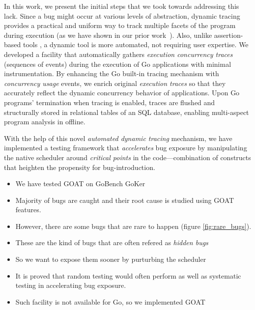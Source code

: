  In
this work, we present the initial steps that we took towards addressing this lack.
%
Since a bug might
occur
at various levels of abstraction, dynamic tracing provides a practical and uniform way to track multiple facets of the program during execution (as we have shown in our prior work~\cite{difftrace}).
%
Also, unlike assertion-based tools \cite{lange-staticType-icse18,wolf-gobra-cav21}, a dynamic tool is more automated, not requiring user expertise.
%
We developed a facility that automatically gathers \textit{execution concurrency traces} (\ie sequences of events) during the execution of Go applications with minimal instrumentation.
%
By enhancing the Go built-in tracing mechanism with \textit{concurrency usage} events, we enrich original \textit{execution traces} so that they accurately reflect the dynamic concurrency behavior of applications.
%
Upon Go programs' termination when tracing is enabled, traces are flushed and structurally stored in relational tables of an SQL database, enabling multi-aspect program analysis in offline.
%

With the help of this novel \textit{automated dynamic tracing} mechanism,
we have implemented a testing framework that
\textit{accelerates} bug exposure by manipulating the native scheduler around \textit{critical points} in the code---combination of constructs that heighten the propensity for bug-introduction.
%
\begin{itemize}
  \item We have tested GOAT on GoBench GoKer
  \item Majority of bugs are caught and their root cause is studied using GOAT features.
  \item However, there are some bugs that are rare to happen (figure \ref{fig:rare_bugs}).
  \item These are the kind of bugs that are often refered as \textit{hidden bugs}
  \item So we want to expose them sooner by purturbing the scheduler
  \item It is proved that random testing would often perform as well as systematic testing in accelerating bug exposure.
  \item Such facility is not available for Go, so we implemented GOAT
\end{itemize}

